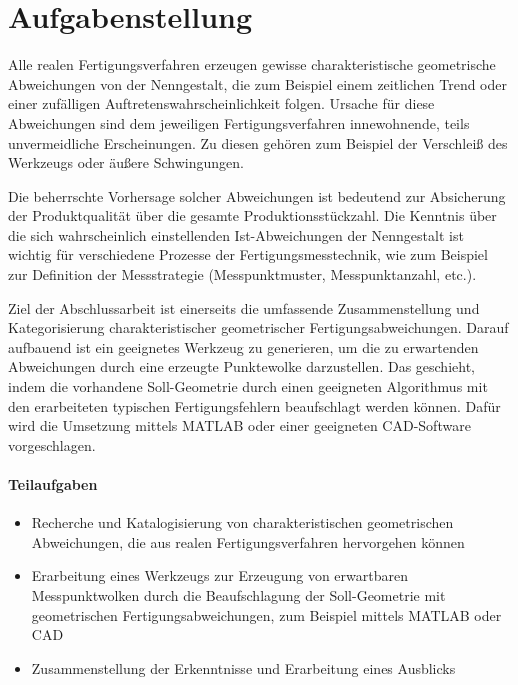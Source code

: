 \section{Aufgabenstellung}

Alle realen Fertigungsverfahren erzeugen gewisse charakteristische geometrische Abweichungen von der Nenngestalt, die zum Beispiel einem zeitlichen Trend oder einer zufälligen Auftretenswahrscheinlichkeit folgen. Ursache für diese Abweichungen sind dem jeweiligen Fertigungsverfahren innewohnende, teils unvermeidliche Erscheinungen. Zu diesen gehören zum Beispiel der Verschleiß des Werkzeugs oder äußere Schwingungen. 

Die beherrschte Vorhersage solcher Abweichungen ist bedeutend zur Absicherung der Produktqualität über die gesamte Produktionsstückzahl. Die Kenntnis über die sich wahrscheinlich einstellenden Ist-Abweichungen der Nenngestalt ist wichtig für verschiedene Prozesse der Fertigungsmesstechnik, wie zum Beispiel zur Definition der Messstrategie (Messpunktmuster, Messpunktanzahl, etc.). 

Ziel der Abschlussarbeit ist einerseits die umfassende Zusammenstellung und Kategorisierung charakteristischer geometrischer Fertigungsabweichungen. Darauf aufbauend ist ein geeignetes Werkzeug zu generieren, um die zu erwartenden Abweichungen durch eine erzeugte Punktewolke darzustellen.
Das geschieht, indem die vorhandene Soll-Geometrie durch einen geeigneten Algorithmus mit den erarbeiteten typischen Fertigungsfehlern beaufschlagt werden können. Dafür wird die Umsetzung mittels MATLAB oder einer geeigneten CAD-Software vorgeschlagen. 

\paragraph{Teilaufgaben}

\begin{itemize}
	\item Recherche und Katalogisierung von charakteristischen geometrischen Abweichungen, die aus realen Fertigungsverfahren hervorgehen können
	\item Erarbeitung eines Werkzeugs zur Erzeugung von erwartbaren Messpunktwolken durch die Beaufschlagung der Soll-Geometrie mit geometrischen Fertigungsabweichungen, zum Beispiel mittels MATLAB oder CAD
	\item Zusammenstellung der Erkenntnisse und Erarbeitung eines Ausblicks  
\end{itemize}